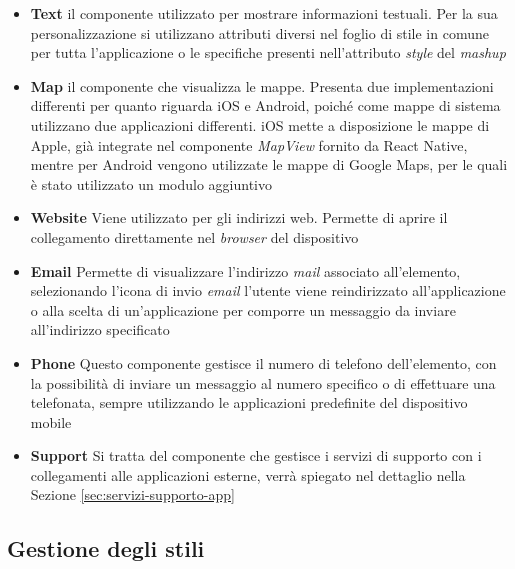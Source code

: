\begin{itemize}
	\item \textbf{Text}
	\upe il componente utilizzato per mostrare informazioni testuali. Per la sua personalizzazione si utilizzano attributi diversi nel foglio di stile in comune per tutta l'applicazione o le specifiche presenti nell'attributo \emph{style} del \textit{mashup}
	\item \textbf{Map}
	\upe il componente che visualizza le mappe. Presenta due implementazioni differenti per quanto riguarda iOS e Android, poiché come mappe di sistema utilizzano due applicazioni differenti. iOS mette a disposizione le mappe di Apple, già integrate nel componente \emph{MapView} fornito da React Native, mentre per Android vengono utilizzate le mappe di Google Maps, per le quali è stato utilizzato un modulo aggiuntivo
	\item \textbf{Website}
	Viene utilizzato per gli indirizzi web. Permette di aprire il collegamento direttamente nel \emph{browser} del dispositivo
	\item \textbf{Email}
	Permette di visualizzare l'indirizzo \emph{mail} associato all'elemento, selezionando l'icona di invio \emph{email} l'utente viene reindirizzato all'applicazione o alla scelta di un'applicazione per comporre un messaggio da inviare all'indirizzo specificato
	\item \textbf{Phone}
	Questo componente gestisce il numero di telefono dell'elemento, con la possibilità di inviare un messaggio al numero specifico o di effettuare una telefonata, sempre utilizzando le applicazioni predefinite del dispositivo mobile
	\item \textbf{Support}
	Si tratta del componente che gestisce i servizi di supporto con i collegamenti alle applicazioni esterne, verrà spiegato nel dettaglio nella Sezione \ref{sec:servizi-supporto-app}
\end{itemize}

\subsection{Gestione degli stili}

